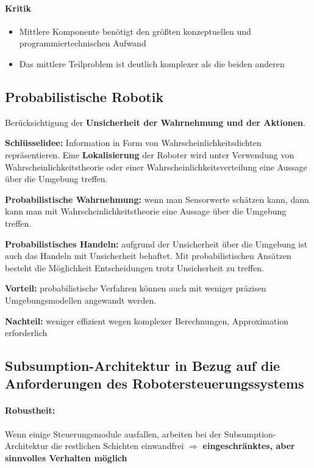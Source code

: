 \paragraph{Kritik}
\begin{itemize}
	\item Mittlere Komponente benötigt den größten konzeptuellen und programmiertechnischen Auf\-wand
	\item Das mittlere Teilproblem ist deutlich komplexer als die beiden anderen
\end{itemize}

\subsection{Probabilistische Robotik}
Berücksichtigung der \textbf{Unsicherheit der Wahrnehmung und der Aktionen}.

\textbf{Schlüsselidee:} Information in Form von Wahrscheinlichkeitsdichten
repräsentieren. Eine \textbf{Lokalisie\-rung} der Roboter wird unter Verwendung
von Wahrscheinlichkeitstheorie oder einer Wahrscheinlichkeitsverteilung eine
Aussage über die Umgebung treffen.

\textbf{Probabilistische Wahrnehmung:} wenn man Sensorwerte schätzen kann,
dann kann man mit Wahrscheinlichkeitstheorie eine Aussage über die Umgebung
treffen.

\textbf{Probabilistisches Handeln:} aufgrund der Unsicherheit über die
Umgebung ist auch das Handeln mit Unsicherheit behaftet. Mit probabilistischen
Ansätzen besteht die Möglichkeit Entscheidungen trotz Unsicherheit zu treffen.

\textbf{Vorteil:} probabilistische Verfahren können auch mit weniger
präzisen Umgebungsmodellen angewandt werden.

\textbf{Nachteil:} weniger effizient wegen komplexer Berechnungen,
Approximation erforderlich

\subsection{Subsumption-Architektur in Bezug auf die Anforderungen des
Roboter\-steuer\-ungssystems}

\paragraph{Robustheit:} Wenn einige Steuerungsmodule ausfallen, arbeiten bei der Subsumption-Architektur die restlichen Schichten einwandfrei $\Rightarrow$ \textbf{eingeschränktes, aber sinnvolles Verhalten möglich}

